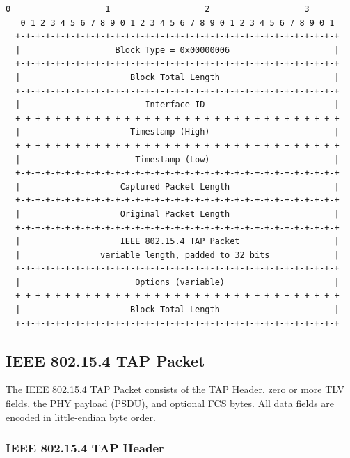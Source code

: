 \documentclass[12pt]{article}
\renewcommand\_{\textunderscore\allowbreak}
\begin{document}
\begin{Verbatim}[samepage=true]
   0                   1                   2                   3
   0 1 2 3 4 5 6 7 8 9 0 1 2 3 4 5 6 7 8 9 0 1 2 3 4 5 6 7 8 9 0 1
  +-+-+-+-+-+-+-+-+-+-+-+-+-+-+-+-+-+-+-+-+-+-+-+-+-+-+-+-+-+-+-+-+
  |                   Block Type = 0x00000006                     |
  +-+-+-+-+-+-+-+-+-+-+-+-+-+-+-+-+-+-+-+-+-+-+-+-+-+-+-+-+-+-+-+-+
  |                      Block Total Length                       |
  +-+-+-+-+-+-+-+-+-+-+-+-+-+-+-+-+-+-+-+-+-+-+-+-+-+-+-+-+-+-+-+-+
  |                         Interface_ID                          |
  +-+-+-+-+-+-+-+-+-+-+-+-+-+-+-+-+-+-+-+-+-+-+-+-+-+-+-+-+-+-+-+-+
  |                      Timestamp (High)                         |
  +-+-+-+-+-+-+-+-+-+-+-+-+-+-+-+-+-+-+-+-+-+-+-+-+-+-+-+-+-+-+-+-+
  |                       Timestamp (Low)                         |
  +-+-+-+-+-+-+-+-+-+-+-+-+-+-+-+-+-+-+-+-+-+-+-+-+-+-+-+-+-+-+-+-+
  |                    Captured Packet Length                     |
  +-+-+-+-+-+-+-+-+-+-+-+-+-+-+-+-+-+-+-+-+-+-+-+-+-+-+-+-+-+-+-+-+
  |                    Original Packet Length                     |
  +-+-+-+-+-+-+-+-+-+-+-+-+-+-+-+-+-+-+-+-+-+-+-+-+-+-+-+-+-+-+-+-+
  |                    IEEE 802.15.4 TAP Packet                   |
  |                variable length, padded to 32 bits             |
  +-+-+-+-+-+-+-+-+-+-+-+-+-+-+-+-+-+-+-+-+-+-+-+-+-+-+-+-+-+-+-+-+
  |                       Options (variable)                      |
  +-+-+-+-+-+-+-+-+-+-+-+-+-+-+-+-+-+-+-+-+-+-+-+-+-+-+-+-+-+-+-+-+
  |                      Block Total Length                       |
  +-+-+-+-+-+-+-+-+-+-+-+-+-+-+-+-+-+-+-+-+-+-+-+-+-+-+-+-+-+-+-+-+
\end{Verbatim}

\newpage
\subsection{IEEE 802.15.4 TAP Packet}

The IEEE 802.15.4 TAP Packet consists of the TAP Header, zero or more TLV
fields, the PHY payload (PSDU), and optional FCS bytes.  All data fields are
encoded in little-endian byte order.

\subsubsection{IEEE 802.15.4 TAP Header}
\end{document}
